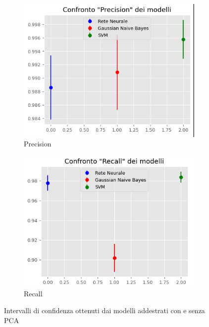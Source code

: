 \begin{figure}[!ht]
    \hfill
    \begin{subfigure}[b]{0.4\textwidth}
        \centering
        \includegraphics[width=\textwidth]{img/ris/precision_inter_corr.png}
        \caption{Precision}
        \label{fig:precision}
    \end{subfigure}
    \hfill
    \begin{subfigure}[b]{0.4\textwidth}
        \centering
        \includegraphics[width=\textwidth]{img/ris/recall_inter_corr.png}
        \caption{Recall}
        \label{fig:recall}
    \end{subfigure}
    \caption{Intervalli di confidenza ottenuti dai modelli addestrati con e senza PCA}
    \label{fig:img_intervalli_confidenza_corr}
\end{figure}


